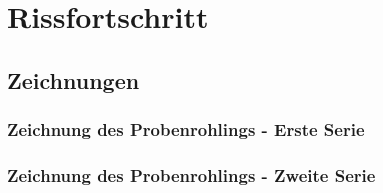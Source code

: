\section{Rissfortschritt}

\subsection{Zeichnungen}
  \label{Zeichnungen}

  \subsubsection{Zeichnung des Probenrohlings - Erste Serie}

  \subsubsection{Zeichnung des Probenrohlings - Zweite Serie}
